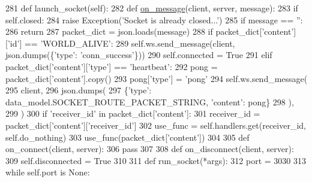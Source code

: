 \begin{DoxyCode}
281     \textcolor{keyword}{def }launch\_socket(self):
282         \textcolor{keyword}{def }\hyperlink{namespaceparlai_1_1chat__service_1_1services_1_1terminal__chat_1_1client_a0ef2bb2bd3b966dcdd8402a92b999708}{on\_message}(client, server, message):
283             \textcolor{keywordflow}{if} self.closed:
284                 \textcolor{keywordflow}{raise} Exception(\textcolor{stringliteral}{'Socket is already closed...'})
285             \textcolor{keywordflow}{if} message == \textcolor{stringliteral}{''}:
286                 \textcolor{keywordflow}{return}
287             packet\_dict = json.loads(message)
288             \textcolor{keywordflow}{if} packet\_dict[\textcolor{stringliteral}{'content'}][\textcolor{stringliteral}{'id'}] == \textcolor{stringliteral}{'WORLD\_ALIVE'}:
289                 self.ws.send\_message(client, json.dumps(\{\textcolor{stringliteral}{'type'}: \textcolor{stringliteral}{'conn\_success'}\}))
290                 self.connected = \textcolor{keyword}{True}
291             \textcolor{keywordflow}{elif} packet\_dict[\textcolor{stringliteral}{'content'}][\textcolor{stringliteral}{'type'}] == \textcolor{stringliteral}{'heartbeat'}:
292                 pong = packet\_dict[\textcolor{stringliteral}{'content'}].copy()
293                 pong[\textcolor{stringliteral}{'type'}] = \textcolor{stringliteral}{'pong'}
294                 self.ws.send\_message(
295                     client,
296                     json.dumps(
297                         \{\textcolor{stringliteral}{'type'}: data\_model.SOCKET\_ROUTE\_PACKET\_STRING, \textcolor{stringliteral}{'content'}: pong\}
298                     ),
299                 )
300             \textcolor{keywordflow}{if} \textcolor{stringliteral}{'receiver\_id'} \textcolor{keywordflow}{in} packet\_dict[\textcolor{stringliteral}{'content'}]:
301                 receiver\_id = packet\_dict[\textcolor{stringliteral}{'content'}][\textcolor{stringliteral}{'receiver\_id'}]
302                 use\_func = self.handlers.get(receiver\_id, self.do\_nothing)
303                 use\_func(packet\_dict[\textcolor{stringliteral}{'content'}])
304 
305         \textcolor{keyword}{def }on\_connect(client, server):
306             \textcolor{keywordflow}{pass}
307 
308         \textcolor{keyword}{def }on\_disconnect(client, server):
309             self.disconnected = \textcolor{keyword}{True}
310 
311         \textcolor{keyword}{def }run\_socket(*args):
312             port = 3030
313             \textcolor{keywordflow}{while} self.port \textcolor{keywordflow}{is} \textcolor{keywordtype}{None}:

\end{DoxyCode}
